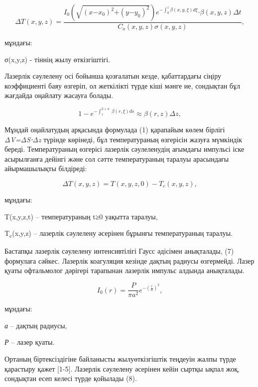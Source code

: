 \begin{equation}
\Delta T(x,y,z) = \frac{I_{0}\left( \sqrt{\left( x\mathbf{-}x_{0} \right)^{2}\mathbf{+}\left( y\mathbf{-}y_{0} \right)^{2}} \right)e^{- \int_{0}^{z}{\beta(x,y,\xi)d\xi}}\mathbf{\cdot}\beta(x,y,z)\Delta t}{C_{o}(x,y,z)\sigma(x,y,z)},
\end{equation}

\begin{multicols}{2}
мұндағы:

σ(x,y,z) - тіннің жылу өткізгіштігі.

Лазерлік сәулелену осі бойынша қозғалатын кезде, қабаттардағы сіңіру
коэффициенті баяу өзгеріп, ол жеткілікті түрде кіші мәнге ие, сондықтан
бұл жағдайда оңайлату жасауға болады.
\end{multicols}

\begin{equation}
1 - e^{- \int_{z}^{2 + a}\mspace{2mu}\mspace{2mu}\beta(r,\xi)ds} \approx \beta(r,z)\Delta z,
\end{equation}

\begin{multicols}{2}
Мұндай оңайлатудың арқасында формулада (1) қарапайым көлем бірлігі
\emph{ΔV=ΔS⋅Δz} түрінде көрінеді, бұл температураның өзгерісін жазуға
мүмкіндік береді. Температураның өзгерісі лазерлік сәулеленудің ағымдағы
импульсі іске асырылғанға дейінгі және сол сәтте температураның таралуы
арасындағы айырмашылықты білдіреді:
\end{multicols}

\begin{equation}
\Delta T(x,y,z) = T(x,y,z,0) - T_{c}(x,y,z),
\end{equation}

\begin{multicols}{2}
мұндағы:

T(x,y,z,t) -- температураның t≥0 уақытта таралуы,

T\textsubscript{c}(x,y,z) -- лазерлік сәулелену әсерінен бұрынғы
температураның таралуы.

Бастапқы лазерлік сәулелену интенсивтілігі Гаусс әдісімен анықталады,
(7) формулаға сәйкес. Лазерлік коагуляция кезінде дақтың радиусы
өзгермейді. Лазер қуаты офтальмолог дәрігері тарапынан лазерлік импульс
алдында анықталады.

\begin{equation}
I_{0}(r) = \frac{P}{\pi a^{2}}e^{- \left( \frac{r}{a} \right)^{2}},
\end{equation}

мұндағы:

\emph{а} -- дақтың радиусы,

\emph{Р} -- лазер қуаты.

Ортаның біртексіздігіне байланысты жылуөткізгіштік теңдеуін жалпы түрде
қарастыру қажет {[}1-5{]}. Лазерлік сәулелену әсерінен кейін сыртқы
ықпал жоқ, сондықтан есеп келесі түрде қойылады (8).
\end{multicols}

